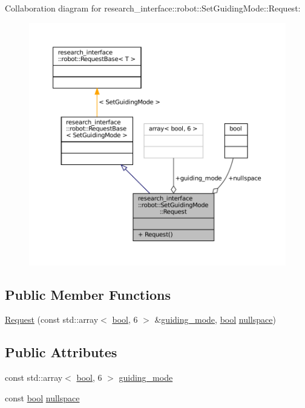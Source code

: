 Collaboration diagram for research\+\_\+interface\+:\+:robot\+:\+:Set\+Guiding\+Mode\+:\+:Request\+:
\nopagebreak
\begin{figure}[H]
\begin{center}
\leavevmode
\includegraphics[width=350pt]{structresearch__interface_1_1robot_1_1SetGuidingMode_1_1Request__coll__graph}
\end{center}
\end{figure}
\subsection*{Public Member Functions}
\begin{DoxyCompactItemize}
\item 
\hyperlink{structresearch__interface_1_1robot_1_1SetGuidingMode_1_1Request_a4d893b8ae2662d0abe9f77a89244907d}{Request} (const std\+::array$<$ \hyperlink{classbool}{bool}, 6 $>$ \&\hyperlink{structresearch__interface_1_1robot_1_1SetGuidingMode_1_1Request_a5f52d21bbbd4fbbf9e8664cd65eda67e}{guiding\+\_\+mode}, \hyperlink{classbool}{bool} \hyperlink{structresearch__interface_1_1robot_1_1SetGuidingMode_1_1Request_a3d4319706be3b155addde664de9590c6}{nullspace})
\end{DoxyCompactItemize}
\subsection*{Public Attributes}
\begin{DoxyCompactItemize}
\item 
const std\+::array$<$ \hyperlink{classbool}{bool}, 6 $>$ \hyperlink{structresearch__interface_1_1robot_1_1SetGuidingMode_1_1Request_a5f52d21bbbd4fbbf9e8664cd65eda67e}{guiding\+\_\+mode}
\item 
const \hyperlink{classbool}{bool} \hyperlink{structresearch__interface_1_1robot_1_1SetGuidingMode_1_1Request_a3d4319706be3b155addde664de9590c6}{nullspace}
\end{DoxyCompactItemize}


